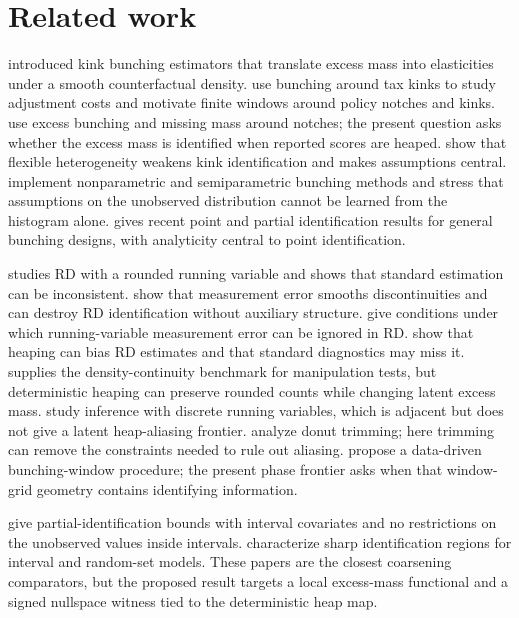 \documentclass[11pt]{article}
\theoremstyle{definition}
\theoremstyle{plain}
\theoremstyle{remark}
\begin{document}
\section{Related work}
\citet{Saez2010Bunching} introduced kink bunching estimators that translate excess mass into elasticities under a smooth counterfactual density. \citet{ChettyFriedmanOlsenPistaferri2011Adjustment} use bunching around tax kinks to study adjustment costs and motivate finite windows around policy notches and kinks. \citet{KlevenWaseem2013Notches} use excess bunching and missing mass around notches; the present question asks whether the excess mass is identified when reported scores are heaped. \citet{BertanhaMcCallumSeegert2021BetterBunching} show that flexible heterogeneity weakens kink identification and makes assumptions central. \citet{BertanhaMcCallumPayneSeegert2022Stata} implement nonparametric and semiparametric bunching methods and stress that assumptions on the unobserved distribution cannot be learned from the histogram alone. \citet{Song2024GeneralBunching} gives recent point and partial identification results for general bunching designs, with analyticity central to point identification.

\citet{Dong2015RoundingRD} studies RD with a rounded running variable and shows that standard estimation can be inconsistent. \citet{DaveziesLeBarbanchon2017RDMeasurementError} show that measurement error smooths discontinuities and can destroy RD identification without auxiliary structure. \citet{DongKolesar2023IgnoreMeasurementError} give conditions under which running-variable measurement error can be ignored in RD. \citet{BarrecaLindoWaddell2016HeapingRD} show that heaping can bias RD estimates and that standard diagnostics may miss it. \citet{McCrary2008DensityTest} supplies the density-continuity benchmark for manipulation tests, but deterministic heaping can preserve rounded counts while changing latent excess mass. \citet{KolesarRothe2018DiscreteRD} study inference with discrete running variables, which is adjacent but does not give a latent heap-aliasing frontier. \citet{NoackRothe2023DonutRD} analyze donut trimming; here trimming can remove the constraints needed to rule out aliasing. \citet{BoschDekkerStrohmaier2020Window} propose a data-driven bunching-window procedure; the present phase frontier asks when that window-grid geometry contains identifying information.

\citet{ManskiTamer2002IntervalData} give partial-identification bounds with interval covariates and no restrictions on the unobserved values inside intervals. \citet{BeresteanuMolchanovMolinari2011ConvexMoment} characterize sharp identification regions for interval and random-set models. These papers are the closest coarsening comparators, but the proposed result targets a local excess-mass functional and a signed nullspace witness tied to the deterministic heap map.
\end{document}
